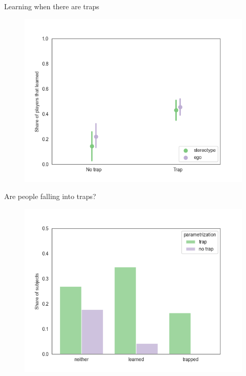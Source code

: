 \documentclass[aspectratio=169]{beamer}
\begin{document}
\begin{frame}{Learning when there are traps}
    \begin{figure}
        \centering
        \includegraphics[scale=.5]{learning_trap_presence.png}
    \end{figure}

\end{frame}

\begin{frame}{Are people falling into traps?}
    \begin{figure}
        \centering
        \includegraphics[scale=.5]{trap_learning.png}
    \end{figure}
    \label{traps}

\end{frame}
\end{document}
